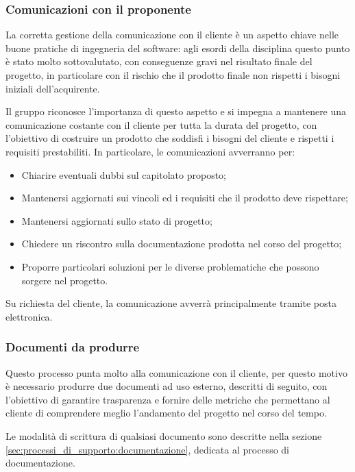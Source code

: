 \subsubsection{Comunicazioni con il proponente}
La corretta gestione della comunicazione con il cliente è un aspetto chiave nelle buone pratiche di ingegneria del software: agli esordi della disciplina questo punto è stato molto sottovalutato, con conseguenze gravi nel risultato finale del progetto, in particolare con il rischio che il prodotto finale non rispetti i bisogni iniziali dell'acquirente.
\par Il gruppo riconosce l'importanza di questo aspetto e si impegna a mantenere una comunicazione costante con il cliente per tutta la durata del progetto, con l'obiettivo di costruire un prodotto che soddisfi i bisogni del cliente e rispetti i requisiti prestabiliti. In particolare, le comunicazioni avverranno per:
\begin{itemize}
    \item Chiarire eventuali dubbi sul capitolato proposto;
    \item Mantenersi aggiornati sui vincoli ed i requisiti che il prodotto deve rispettare;
    \item Mantenersi aggiornati sullo stato di progetto;
    \item Chiedere un riscontro sulla documentazione prodotta nel corso del progetto;
    \item Proporre particolari soluzioni per le diverse problematiche che possono sorgere nel progetto.
\end{itemize}
\par Su richiesta del cliente, la comunicazione avverrà principalmente tramite posta elettronica.
\subsubsection{Documenti da produrre}
Questo processo punta molto alla comunicazione con il cliente, per questo motivo è necessario produrre due documenti ad uso esterno, descritti di seguito, con l'obiettivo di garantire trasparenza e fornire delle metriche che permettano al cliente di comprendere meglio l'andamento del progetto nel corso del tempo.
\par Le modalità di scrittura di qualsiasi documento sono descritte nella sezione \ref{sec:processi_di_supporto:documentazione}, dedicata al processo di documentazione.
